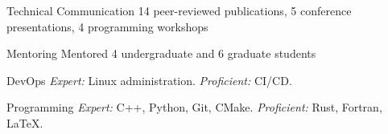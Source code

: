 


\begin{cvskills}


\cvskill
{Technical Communication} %
{14 peer-reviewed publications, 5 conference presentations, 4 programming workshops} %


\cvskill
{Mentoring} %
{Mentored 4 undergraduate and 6 graduate students} %


\cvskill
{DevOps} %
{\textit{Expert:} Linux administration. \textit{Proficient:} CI/CD.}


\cvskill
{Programming} %
{\textit{Expert:} C++, Python, Git, CMake. \textit{Proficient:} Rust, Fortran, LaTeX.} %


\end{cvskills}
